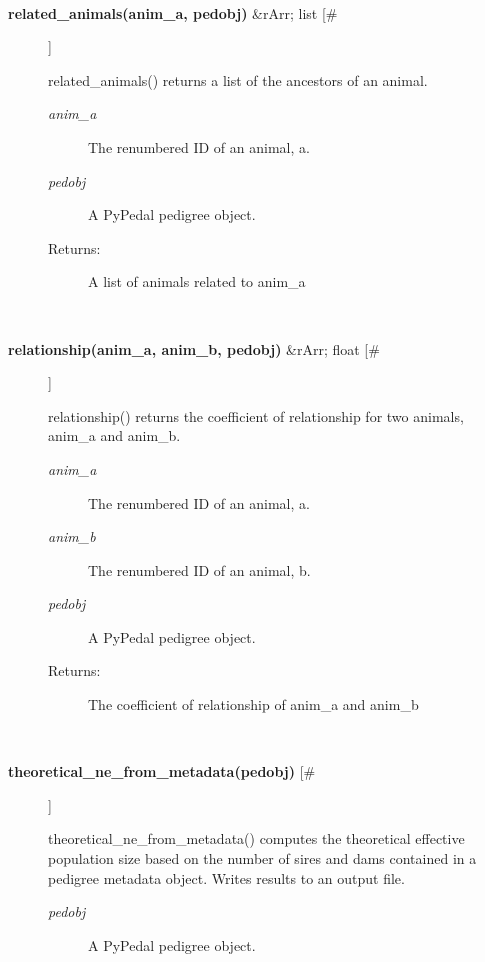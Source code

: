 \documentclass[10pt]{article}
\begin{document}
\begin{description}
\begin{description}
\end{description}
\\ 

\item[\textbf{related\_animals(anim\_a, pedobj)}
 \&rArr; list [\#]]

 related\_animals() returns a list of the ancestors of an animal.
\begin{description}
\item[\emph{anim\_a}
] The renumbered ID of an animal, a.
\item[\emph{pedobj}
] A PyPedal pedigree object.
\item[Returns:] A list of animals related to anim\_a

\end{description}
\\ 

\item[\textbf{relationship(anim\_a, anim\_b, pedobj)}
 \&rArr; float [\#]]

 relationship() returns the coefficient of relationship for two animals, anim\_a and anim\_b.
\begin{description}
\item[\emph{anim\_a}
] The renumbered ID of an animal, a.
\item[\emph{anim\_b}
] The renumbered ID of an animal, b.
\item[\emph{pedobj}
] A PyPedal pedigree object.
\item[Returns:] The coefficient of relationship of anim\_a and anim\_b

\end{description}
\\ 

\item[\textbf{theoretical\_ne\_from\_metadata(pedobj)}
 [\#]]

 theoretical\_ne\_from\_metadata() computes the theoretical effective population size based on the number of sires and dams contained in a pedigree metadata object. Writes results to an output file.
\begin{description}
\item[\emph{pedobj}
] A PyPedal pedigree object.

\end{description}
\\ 


\end{description}
\end{document}
